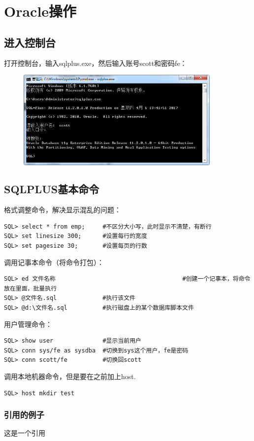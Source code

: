 \section{Oracle操作}

\subsection{进入控制台}
打开控制台，输入sqlplus.exe，然后输入账号scott和密码fe：
\begin{figure}[H]
  \centering
  \includegraphics[width=10cm]{oracle/打开sqlplus.png}
\end{figure}

\subsection{SQLPLUS基本命令}
格式调整命令，解决显示混乱的问题：
\begin{verbatim}
SQL> select * from emp;     #不区分大小写，此时显示不清楚，有断行
SQL> set linesize 300;      #设置每行的宽度
SQL> set pagesize 30;       #设置每页的行数
\end{verbatim}

调用记事本命令（将命令打包）：
\begin{verbatim}
SQL> ed 文件名称                                    #创建一个记事本，将命令放在里面，批量执行
SQL> @文件名.sql             #执行该文件
SQL> @d:\文件名.sql          #执行磁盘上的某个数据库脚本文件
\end{verbatim}

用户管理命令：
\begin{verbatim}
SQL> show user              #显示当前用户
SQL> conn sys/fe as sysdba  #切换到sys这个用户，fe是密码
SQL> conn scott/fe          #切换回scott
\end{verbatim}

调用本地机器命令，但是要在之前加上host.
\begin{verbatim}
SQL> host mkdir test
\end{verbatim}
\subsubsection{引用的例子}
这是一个引用~\cite{LCN2002}

